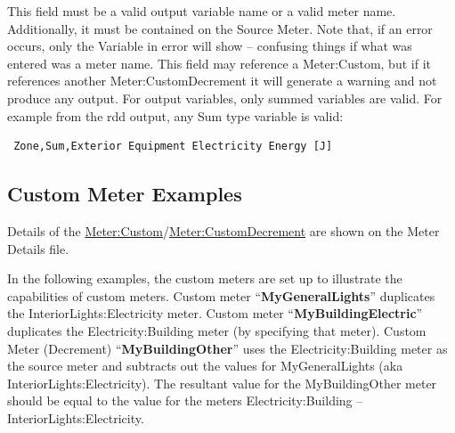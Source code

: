 This field must be a valid output variable name or a valid meter name. Additionally, it must be contained on the Source Meter. Note that, if an error occurs, only the Variable in error will show -- confusing things if what was entered was a meter name. This field may reference a Meter:Custom, but if it references another Meter:CustomDecrement it will generate a warning and not produce any output. For output variables, only summed variables are valid. For example from the rdd output, any Sum type variable is valid:
\begin{lstlisting}
 Zone,Sum,Exterior Equipment Electricity Energy [J]
\end{lstlisting}

\subsection{Custom Meter Examples}\label{custom-meter-examples}

Details of the \hyperref[metercustom]{Meter:Custom}/\hyperref[metercustomdecrement]{Meter:CustomDecrement} are shown on the Meter Details file.

In the following examples, the custom meters are set up to illustrate the capabilities of custom meters. Custom meter ``\textbf{MyGeneralLights}'' duplicates the InteriorLights:Electricity meter. Custom meter ``\textbf{MyBuildingElectric}'' duplicates the Electricity:Building meter (by specifying that meter). Custom Meter (Decrement) ``\textbf{MyBuildingOther}'' uses the Electricity:Building meter as the source meter and subtracts out the values for MyGeneralLights (aka InteriorLights:Electricity). The resultant value for the MyBuildingOther meter should be equal to the value for the meters Electricity:Building -- InteriorLights:Electricity.

